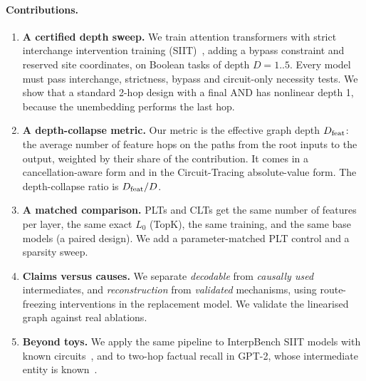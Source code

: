 \paragraph{Contributions.}
\begin{enumerate}
\item \textbf{A certified depth sweep.} We train attention transformers with strict interchange intervention training (SIIT)~\cite{gupta2024interpbench}, adding a bypass constraint and reserved site coordinates, on Boolean tasks of depth $D=1..5$. Every model must pass interchange, strictness, bypass and circuit-only necessity tests. We show that a standard 2-hop design with a final AND has nonlinear depth 1, because the unembedding performs the last hop.
\item \textbf{A depth-collapse metric.} Our metric is the effective graph depth $D_{\mathrm{feat}}$: the average number of feature hops on the paths from the root inputs to the output, weighted by their share of the contribution. It comes in a cancellation-aware form and in the Circuit-Tracing absolute-value form. The depth-collapse ratio is $D_{\mathrm{feat}}/D$.
\item \textbf{A matched comparison.} PLTs and CLTs get the same number of features per layer, the same exact $L_0$ (TopK), the same training, and the same base models (a paired design). We add a parameter-matched PLT control and a sparsity sweep.
\item \textbf{Claims versus causes.} We separate \emph{decodable} from \emph{causally used} intermediates, and \emph{reconstruction} from \emph{validated} mechanisms, using route-freezing interventions in the replacement model. We validate the linearised graph against real ablations.
\item \textbf{Beyond toys.} We apply the same pipeline to InterpBench SIIT models with known circuits~\cite{gupta2024interpbench}, and to two-hop factual recall in GPT-2, whose intermediate entity is known~\cite{lindsey2025biology}.
\end{enumerate}
